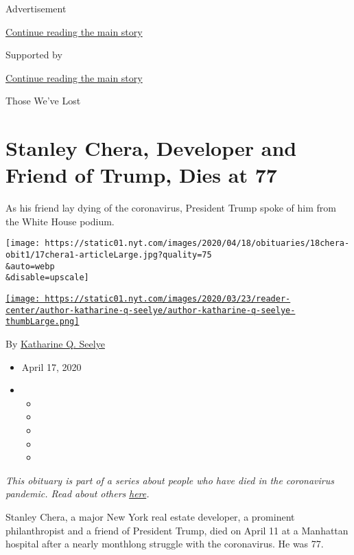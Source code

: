 Advertisement

\protect\hyperlink{after-top}{Continue reading the main story}

Supported by

\protect\hyperlink{after-sponsor}{Continue reading the main story}

Those We've Lost

\hypertarget{stanley-chera-developer-and-friend-of-trump-dies-at-77}{%
\section{Stanley Chera, Developer and Friend of Trump, Dies at
77}\label{stanley-chera-developer-and-friend-of-trump-dies-at-77}}

As his friend lay dying of the coronavirus, President Trump spoke of him
from the White House podium.

\texttt{[image: https://static01.nyt.com/images/2020/04/18/obituaries/18chera-obit1/17chera1-articleLarge.jpg?quality=75\\\&auto=webp\\\&disable=upscale]}

\href{https://www.nytimes.com/by/katharine-q-seelye}{\texttt{[image: https://static01.nyt.com/images/2020/03/23/reader-center/author-katharine-q-seelye/author-katharine-q-seelye-thumbLarge.png]}}

By \href{https://www.nytimes.com/by/katharine-q-seelye}{Katharine Q.
Seelye}

\begin{itemize}
\item
  April 17, 2020
\item
  \begin{itemize}
  \item
  \item
  \item
  \item
  \item
  \end{itemize}
\end{itemize}

\emph{This obituary is part of a series about people who have died in
the coronavirus pandemic. Read about others}
\href{https://www.nytimes.com/series/people-who-have-died-of-the-coronavirus}{\emph{here}}\emph{.}

Stanley Chera, a major New York real estate developer, a prominent
philanthropist and a friend of President Trump, died on April 11 at a
Manhattan hospital after a nearly monthlong struggle with the
coronavirus. He was 77.

